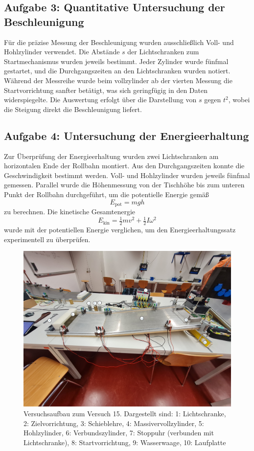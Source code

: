 \subsection*{Aufgabe 3: Quantitative Untersuchung der Beschleunigung}
Für die präzise Messung der Beschleunigung wurden ausschließlich Voll- und Hohlzylinder verwendet.  
Die Abstände $s$ der Lichtschranken zum Startmechanismus wurden jeweils bestimmt. Jeder Zylinder 
wurde fünfmal gestartet, und die Durchgangszeiten an den Lichtschranken wurden notiert.  
Während der Messreihe wurde beim vollzylinder ab der vierten Messung die Startvorrichtung sanfter 
betätigt, was sich geringfügig in den Daten widerspiegelte. Die Auswertung erfolgt über die 
Darstellung von $s$ gegen $t^2$, wobei die Steigung direkt die Beschleunigung liefert.

\subsection*{Aufgabe 4: Untersuchung der Energieerhaltung}
Zur Überprüfung der Energieerhaltung wurden zwei Lichtschranken am horizontalen Ende der Rollbahn 
montiert. Aus den Durchgangszeiten konnte die Geschwindigkeit bestimmt werden. Voll- und Hohlzylinder 
wurden jeweils fünfmal gemessen. Parallel wurde die Höhenmessung von der Tischhöhe bis zum unteren 
Punkt der Rollbahn durchgeführt, um die potentielle Energie gemäß 
\[
E_\text{pot} = m g h
\]
zu berechnen. Die kinetische Gesamtenergie 
\[
E_\text{kin} = \tfrac{1}{2} m v^2 + \tfrac{1}{2} I \omega^2
\]
wurde mit der potentiellen Energie verglichen, um den Energieerhaltungssatz experimentell zu überprüfen.

\begin{figure}[!ht]
    \onecolumn
    \centering
    \includegraphics[width=\textwidth]{img/15/Versuchsaufbau.pdf}
    \caption{Versuchsaufbau zum Versuch 15. Dargestellt sind: 1: Lichtschranke, 2: Zielvorrichtung, 3: Schieblehre, 4: Massivervollzylinder, 5: Hohlzylinder, 6: Verbundszylinder, 7: Stoppuhr (verbunden mit Lichtschranke), 8: Startvorrichtung, 9: Wasserwaage, 10: Laufplatte}
    \twocolumn
\end{figure}